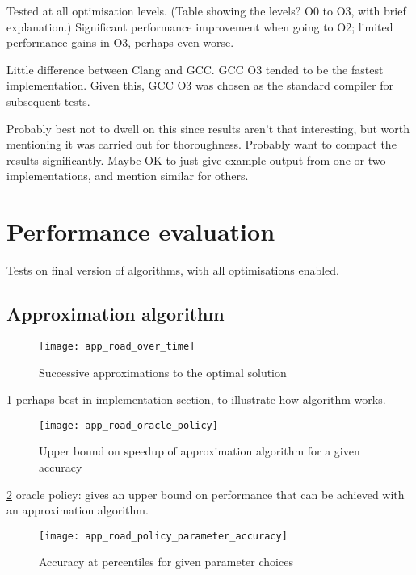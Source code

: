 Tested at all optimisation levels. (Table showing the levels? O0 to O3, with brief explanation.) Significant performance improvement when going to O2; limited performance gains in O3, perhaps even worse.

Little difference between Clang and GCC. GCC O3 tended to be the fastest implementation. Given this, GCC O3 was chosen as the standard compiler for subsequent tests.

Probably best not to dwell on this since results aren't that interesting, but worth mentioning it was carried out for thoroughness. Probably want to compact the results significantly. Maybe OK to just give example output from one or two implementations, and mention similar for others.

\section{Performance evaluation}

Tests on final version of algorithms, with all optimisations enabled.

\subsection{Approximation algorithm} \label{sec:eval-approx}


\begin{figure}
    \centering
    \texttt{[image: app\_road\_over\_time]}
    \caption{Successive approximations to the optimal solution}
    \label{fig:app-cost-over-time}
\end{figure}

\cref{fig:app-cost-over-time} perhaps best in implementation section, to illustrate how algorithm works.

\begin{figure}
    \centering
    \texttt{[image: app\_road\_oracle\_policy]}
    \caption{Upper bound on speedup of approximation algorithm for a given accuracy}
    \label{fig:app-oracle-policy}
\end{figure}

\cref{fig:app-oracle-policy} oracle policy: gives an upper bound on performance that can be achieved with an approximation algorithm.

\begin{figure}
    \centering
    \texttt{[image: app\_road\_policy\_parameter\_accuracy]}
    \caption{Accuracy at percentiles for given parameter choices}
    \label{fig:app-policy-parameter-accuracy}
\end{figure}


